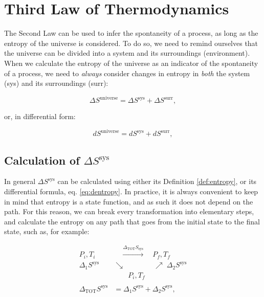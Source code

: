 \documentclass[
  9pt,
]{extbook}
\theoremstyle{definition}
\theoremstyle{definition}
\theoremstyle{definition}
\theoremstyle{remark}
\begin{document}
\renewcommand*{\standardstate}{{-\kern-6pt{\ominus}\kern-6pt-}}

\hypertarget{thirdlaw}{%
\chapter{Third Law of Thermodynamics}\label{thirdlaw}}

The Second Law can be used to infer the spontaneity of a process, as long as the entropy of the universe is considered. To do so, we need to remind ourselves that the universe can be divided into a system and its surroundings (environment). When we calculate the entropy of the universe as an indicator of the spontaneity of a process, we need to \emph{always} consider changes in entropy in \emph{both} the system (sys) and its surroundings (surr):

\begin{equation}
\Delta S^{\mathrm{universe}} = \Delta S^{\mathrm{sys}} + \Delta S^{\mathrm{surr}},
\label{eq:dsuniv}
\end{equation}

or, in differential form:

\begin{equation}
d S^{\mathrm{universe}} = d S^{\mathrm{sys}} + d S^{\mathrm{surr}},
\label{eq:dsunivd}
\end{equation}

\hypertarget{dssys}{%
\section{\texorpdfstring{Calculation of \(\Delta S^{\mathrm{sys}}\)}{Calculation of \textbackslash Delta S\^{}\{\textbackslash mathrm\{sys\}\}}}\label{dssys}}

In general \(\Delta S^{\mathrm{sys}}\) can be calculated using either its Definition \ref{def:entropy}, or its differential formula, eq. \eqref{eq:dentropy}. In practice, it is always convenient to keep in mind that entropy is a state function, and as such it does not depend on the path. For this reason, we can break every transformation into elementary steps, and calculate the entropy on any path that goes from the initial state to the final state, such as, for example:

\begin{equation}
\begin{aligned}
P_i, T_i & \quad \xrightarrow{ \Delta_{\text{TOT}} S_{\text{sys}} } \quad P_f, T_f \\
  \scriptstyle{\Delta_1 S^{\text{sys}}} & \searrow \qquad  \qquad \nearrow \; \scriptstyle{\Delta_2 S^{\text{sys}}} \\
& \qquad P_i, T_f \\
\\
\Delta_{\text{TOT}} S^{\text{sys}} & = \Delta_1 S^{\text{sys}} + \Delta_2 S^{\text{sys}},
\end{aligned}
\label{eq:entropycycle}
\end{equation}
\end{document}
